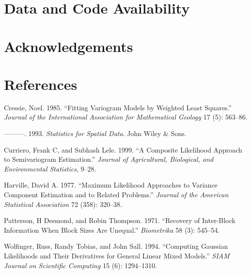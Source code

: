 \documentclass{article}
\begin{document}
\hypertarget{data-and-code-availability}{%
\section*{Data and Code Availability}\label{data-and-code-availability}}

\hypertarget{acknowledgements}{%
\section*{Acknowledgements}\label{acknowledgements}}

\hypertarget{references}{%
\section*{References}\label{references}}

\hypertarget{refs}{}
\leavevmode\hypertarget{ref-cressie1985fitting}{}%
Cressie, Noel. 1985. ``Fitting Variogram Models by Weighted Least
Squares.'' \emph{Journal of the International Association for
Mathematical Geology} 17 (5): 563--86.

\leavevmode\hypertarget{ref-cressie1993statistics}{}%
---------. 1993. \emph{Statistics for Spatial Data}. John Wiley \& Sons.

\leavevmode\hypertarget{ref-curriero1999composite}{}%
Curriero, Frank C, and Subhash Lele. 1999. ``A Composite Likelihood
Approach to Semivariogram Estimation.'' \emph{Journal of Agricultural,
Biological, and Environmental Statistics}, 9--28.

\leavevmode\hypertarget{ref-harville1977maximum}{}%
Harville, David A. 1977. ``Maximum Likelihood Approaches to Variance
Component Estimation and to Related Problems.'' \emph{Journal of the
American Statistical Association} 72 (358): 320--38.

\leavevmode\hypertarget{ref-patterson1971recovery}{}%
Patterson, H Desmond, and Robin Thompson. 1971. ``Recovery of
Inter-Block Information When Block Sizes Are Unequal.''
\emph{Biometrika} 58 (3): 545--54.

\leavevmode\hypertarget{ref-wolfinger1994computing}{}%
Wolfinger, Russ, Randy Tobias, and John Sall. 1994. ``Computing Gaussian
Likelihoods and Their Derivatives for General Linear Mixed Models.''
\emph{SIAM Journal on Scientific Computing} 15 (6): 1294--1310.



\end{document}
